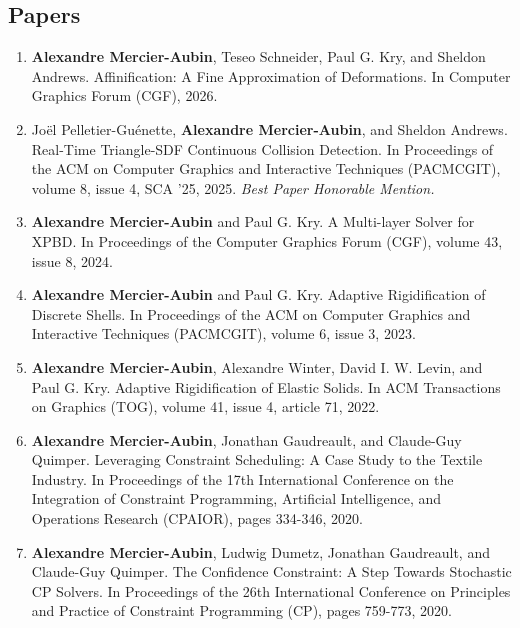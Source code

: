 \documentclass[10pt]{article} %
\begin{document}
\subsection{Papers}
%
%
\begin{enumerate}
\setcounter{enumi}{\value{listCounter}}
\item \textbf{Alexandre Mercier-Aubin}, Teseo Schneider, Paul G. Kry, and Sheldon Andrews. Affinification: A Fine Approximation of Deformations. In Computer Graphics Forum (CGF), 2026. 

\item Joël Pelletier-Guénette, \textbf{Alexandre Mercier-Aubin}, and Sheldon Andrews. Real-Time Triangle-SDF Continuous Collision Detection. In Proceedings of the ACM on Computer Graphics and Interactive Techniques (PACMCGIT), volume 8, issue 4, SCA '25, 2025. \textit{Best Paper Honorable Mention.} 

\item \textbf{Alexandre Mercier-Aubin} and Paul G. Kry. A Multi-layer Solver for XPBD. In Proceedings of the Computer Graphics Forum (CGF), volume 43, issue 8, 2024. 

\item \textbf{Alexandre Mercier-Aubin} and Paul G. Kry. Adaptive Rigidification of Discrete Shells. In Proceedings of the ACM on Computer Graphics and Interactive Techniques (PACMCGIT), volume 6, issue 3, 2023. 

\item \textbf{Alexandre Mercier-Aubin},  Alexandre Winter,  David I. W. Levin, and Paul G. Kry. Adaptive Rigidification of Elastic Solids. In ACM Transactions on Graphics (TOG), volume 41, issue 4, article 71, 2022.  

\item \textbf{Alexandre Mercier-Aubin}, Jonathan Gaudreault, and Claude-Guy Quimper. Leveraging Constraint Scheduling: A Case Study to the Textile Industry. In Proceedings of the 17th International Conference on the Integration of Constraint Programming, Artificial Intelligence, and Operations Research (CPAIOR), pages 334-346, 2020. 

\item \textbf{Alexandre Mercier-Aubin}, Ludwig Dumetz, Jonathan Gaudreault, and Claude-Guy Quimper. The Confidence Constraint: A Step Towards Stochastic CP Solvers. In Proceedings of the 26th International Conference on Principles and Practice of Constraint Programming (CP), pages 759-773, 2020. 

\end{enumerate}
\end{document}
